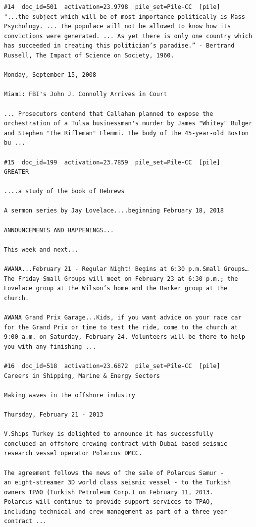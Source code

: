 \begin{verbatim}
#14  doc_id=501  activation=23.9798  pile_set=Pile-CC  [pile]
"...the subject which will be of most importance politically is Mass Psychology. ... The populace will not be allowed to know how its convictions were generated. ... As yet there is only one country which has succeeded in creating this politician’s paradise.” - Bertrand Russell, The Impact of Science on Society, 1960.

Monday, September 15, 2008

Miami: FBI's John J. Connolly Arrives in Court

... Prosecutors contend that Callahan planned to expose the orchestration of a Tulsa businessman's murder by James "Whitey" Bulger and Stephen "The Rifleman" Flemmi. The body of the 45-year-old Boston bu ...

#15  doc_id=199  activation=23.7859  pile_set=Pile-CC  [pile]
GREATER

....a study of the book of Hebrews

A sermon series by Jay Lovelace....beginning February 18, 2018

ANNOUNCEMENTS AND HAPPENINGS...

This week and next...

AWANA...February 21 - Regular Night! Begins at 6:30 p.m.Small Groups…The Friday Small Groups will meet on February 23 at 6:30 p.m.; the Lovelace group at the Wilson’s home and the Barker group at the church.

AWANA Grand Prix Garage...Kids, if you want advice on your race car for the Grand Prix or time to test the ride, come to the church at 9:00 a.m. on Saturday, February 24. Volunteers will be there to help you with any finishing ...

#16  doc_id=518  activation=23.6872  pile_set=Pile-CC  [pile]
Careers in Shipping, Marine & Energy Sectors

Making waves in the offshore industry

Thursday, February 21 - 2013

V.Ships Turkey is delighted to announce it has successfully
concluded an offshore crewing contract with Dubai-based seismic
research vessel operator Polarcus DMCC.

The agreement follows the news of the sale of Polarcus Samur -
an eight-streamer 3D world class seismic vessel - to the Turkish
owners TPAO (Turkish Petroleum Corp.) on February 11, 2013.
Polarcus will continue to provide support services to TPAO,
including technical and crew management as part of a three year
contract ...


\end{verbatim}
